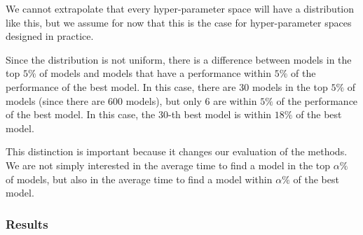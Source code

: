 We cannot extrapolate that every hyper-parameter space will have a distribution like this, but we assume for now that this is the case for hyper-parameter spaces designed in practice.

Since the distribution is not uniform, there is a difference between models in the top $5 \%$ of models and models that have a performance within $5 \%$ of the performance of the best model. In this case, there are 30 models in the top $5 \%$ of models (since there are 600 models), but only 6 are within $5 \%$ of the performance of the best model. In this case, the 30-th best model is within $18 \%$ of the best model.

This distinction is important because it changes our evaluation of the methods. We are not simply interested in the average time to find a model in the top $\alpha \%$ of models, but also in the average time to find a model within $\alpha \%$ of the best model.

\subsubsection{Results}

